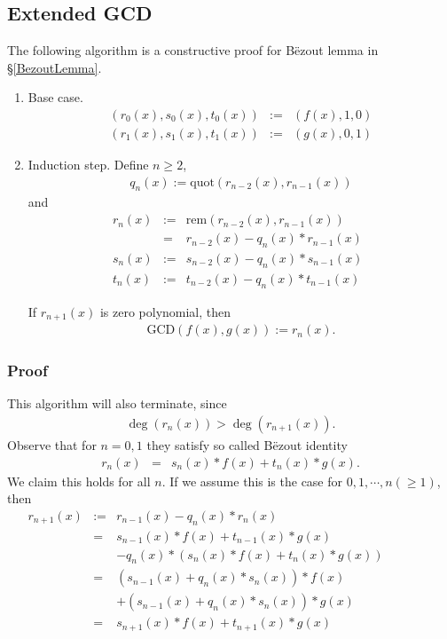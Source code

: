 \documentclass[11pt]{book}
\begin{document}
\subsection{Extended GCD}
The following algorithm is a constructive proof for B\"ezout lemma in \S\ref{BezoutLemma}.
\begin{enumerate}
\item Base case.
\begin{eqnarray}
\left( r_0(x), s_0(x), t_0(x) \right) &:=& \left( f(x), 1, 0\right) \\
\left( r_1(x), s_1(x), t_1(x) \right) &:=& \left( g(x), 0, 1\right)
\end{eqnarray}

\item Induction step.
Define $n \geq 2$,
\begin{eqnarray}
q_n(x) := \text{quot}\left( r_{n-2}(x), r_{n-1}(x) \right)
\end{eqnarray}
and
\begin{eqnarray}
r_n(x) &:=& \text{rem}\left( r_{n-2}(x), r_{n-1}(x) \right) \qquad \\
&=& r_{n-2}(x) - q_n(x) * r_{n-1}(x) \\
s_n(x) &:=& s_{n-2}(x) - q_n(x) * s_{n-1}(x) \\
t_n(x) &:=& t_{n-2}(x) - q_n(x) * t_{n-1}(x) 
\end{eqnarray}

If $r_{n+1}(x)$ is zero polynomial, then
\begin{eqnarray}
\text{GCD}\left( f(x), g(x) \right) := r_n(x).
\end{eqnarray}

\end{enumerate}

\subsubsection{Proof}
This algorithm will also terminate, since
\begin{eqnarray}
\deg\left(r_n(x) \right) > \deg\left(r_{n+1}(x) \right).
\end{eqnarray}
Observe that for $n=0,1$ they satisfy so called B\"ezout identity
\begin{eqnarray}
r_n(x) &=& s_n(x) * f(x) + t_n(x) * g(x).
\end{eqnarray}
We claim this holds for all $n$.
If we assume this is the case for $0,1, \cdots, n(\geq 1)$, then
\begin{eqnarray}
r_{n+1}(x)
&:=& r_{n-1}(x) - q_n(x) * r_{n}(x) \\
\nonumber &=& s_{n-1}(x) * f(x) + t_{n-1}(x) * g(x) \\
&&- q_n(x) * \left( s_n(x) * f(x) + t_n(x) * g(x) \right) \qquad \qquad \\
\nonumber &=& \left( s_{n-1}(x) + q_n(x) * s_n(x) \right) * f(x) \\
&&+ \left( s_{n-1}(x) + q_n(x) * s_n(x) \right) * g(x) \\
&=& s_{n+1}(x) * f(x) + t_{n+1}(x) * g(x)
\end{eqnarray}
\end{document}
